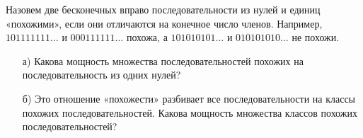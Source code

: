 \documentclass[12pt, a4paper, oneside]{article}
\begin{document}
\begin{problem}{}
Назовем две бесконечных вправо последовательности из нулей и единиц «похожими», если они отличаются на конечное число членов. Например, $101111111 \ldots$ и $000111111 \ldots$ похожа, а $101010101 \ldots$ и $010101010 \ldots$ не похожи.
    \begin{enumerate}
        \item[а)] Какова мощность множества последовательностей похожих на последовательность из одних нулей?
        \item[б)] Это отношение «похожести» разбивает все последовательности на классы похожих последовательностей. Какова мощность множества классов похожих последовательностей?
    \end{enumerate}
\end{problem}
\end{document}
